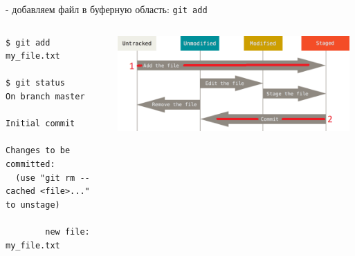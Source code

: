 \documentclass[presentation]{beamer}
\begin{document}
\begin{frame}[fragile,label={sec:org737c3b7}]{- добавляем файл в буферную область:}
 \alert{\texttt{git add}}

\begin{columns}
\begin{column}{0.65\columnwidth}
\begin{verbatim}
$ git add my_file.txt

$ git status
On branch master

Initial commit

Changes to be committed:
  (use "git rm --cached <file>..." to unstage)

        new file:   my_file.txt
\end{verbatim}
\end{column}

\begin{column}{0.35\columnwidth}
\begin{center}
\includegraphics[width=0.98\textwidth]{./01_vcs_01_git_file_states_01_add.png}
\end{center}
\end{column}
\end{columns}
\end{frame}
\end{document}
